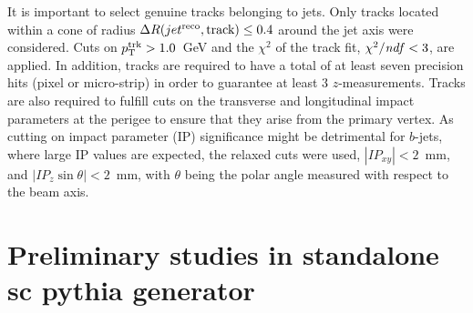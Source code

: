
It is important to select genuine tracks belonging to jets. Only tracks located  within a cone of radius $\Delta R(jet^{\rm reco},\rm track) \leq 0.4$ around the jet axis were considered. %
  Cuts on $p_{\rm{T}}^{\rm{trk}}>1.0$~GeV and the $\chi^2$ of the track fit, $\chi^2/{\it ndf}<3$, are applied. %
 In addition, tracks are required to have a total of at least seven precision hits (pixel or micro-strip) in order to guarantee at least 3 $z$-measurements. Tracks are also required to fulfill cuts on the transverse and longitudinal impact parameters at the perigee to ensure that they arise from  the primary vertex. As cutting on impact parameter (IP) significance might be detrimental for $b$-jets, where large IP values are expected, the relaxed cuts were used, $|IP_{xy}|<2$~mm, and $|IP_{z}\sin\theta|<2$~mm, with $\theta$ being the polar angle measured with respect to the beam axis. %



\section{Preliminary studies in standalone {sc pythia } generator}\label{sec:gbbKine}


